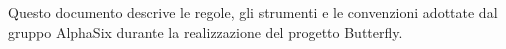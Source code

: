 Questo documento descrive le regole, gli strumenti e le convenzioni adottate dal
gruppo AlphaSix durante la realizzazione del progetto Butterfly.